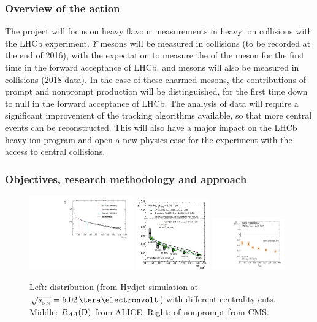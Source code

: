 \documentclass[a4paper,11pt]{article}
\begin{document}
\subsubsection{Overview of the action}

The project will focus on heavy flavour measurements in heavy ion collisions with the LHCb experiment. $\Upsilon$ mesons will be measured in \pPb collisions (to be recorded at the end of 2016), with the expectation to measure the \rpa of the \PgUc meson for the first time in the forward acceptance of LHCb.
\Dz and \Jpsi mesons will also be measured in \pbpb collisions (2018 data). In the case of these charmed mesons, the contributions of prompt and nonprompt production will be distinguished, for the first time
down to null \pt in the forward acceptance of LHCb. The analysis of \pbpb data will require a significant improvement of the tracking algorithms available, so that more
central events can be reconstructed. This will also have a major impact on the LHCb heavy-ion program and open a new physics case for the experiment with the access
to central \pbpb collisions.


\subsubsection{Objectives, research methodology and approach}

\begin{figure}[htb]
  \begin{center}
    \includegraphics[width=0.4\textwidth]{plots/centrality.pdf}
    \includegraphics[width=0.28\textwidth]{plots/ALICE_D0.pdf}
    \includegraphics[width=0.28\textwidth]{plots/NonPromptJpsi_RAAvsCent_slides.pdf}
  \end{center}
  \caption{Left: \npart distribution (from Hydjet simulation at $\sqrtsnn = 5.02\,\TeV$) with different centrality cuts. Middle: $R_{AA}(\text{D})$ from ALICE. Right: \raa of nonprompt \Jpsi from CMS.
  \label{fig:npart}}
\end{figure}
\end{document}
